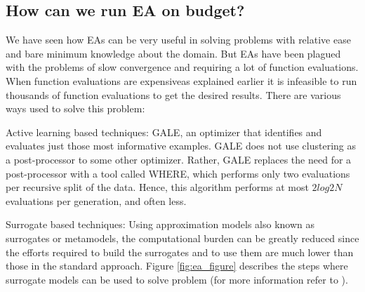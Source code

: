 \documentclass{newsig}
\begin{document}
\subsection*{How can we run EA on budget?}\label{section:frugal}
We have seen how EAs can be very useful in solving problems with relative ease and bare minimum knowledge about the domain. But EAs have been plagued with the problems of slow convergence and requiring a lot of function evaluations. When function evaluations are \textquotesingle expensive\textquotesingle as explained earlier it is infeasible to run thousands of function evaluations  to get the desired results. There are various ways used to solve this problem:
\begin{compactitem}
\item{Active learning based techniques: GALE, an optimizer that identifies and evaluates just
those most informative examples. 
GALE does not use clustering as a post-processor to some
other optimizer. Rather, GALE replaces the need for a
post-processor with a tool called WHERE, which performs only two evaluations per recursive split of the
data. Hence, this algorithm performs at most $2log 2N$
evaluations per generation, and often less.}
\item{Surrogate based techniques: Using approximation models
also known as surrogates or metamodels, the computational
burden can be greatly reduced since the efforts required to
build the surrogates and to use them are much lower than
those in the standard approach. Figure \ref{fig:ea_figure} describes the steps where surrogate models can be used to solve problem (for more information refer to \cite{rasheed2000informed}).}
\end{compactitem}
\end{document}
